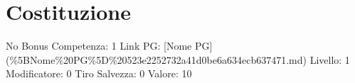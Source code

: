\section{Costituzione}\label{costituzione}

\begin{description}
\tightlist
\item[Tags: STAT]
No Bonus Competenza: 1 Link PG: {[}Nome PG{]}
(\%5BNome\%20PG\%5D\%20523e2252732a41d0be6a634ecb637471.md) Livello: 1
Modificatore: 0 Tiro Salvezza: 0 Valore: 10
\end{description}
